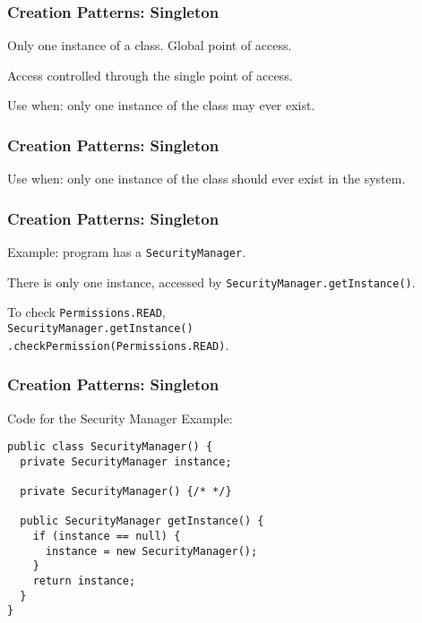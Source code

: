 \begin{frame}
\frametitle{Creation Patterns: Singleton}
\begin{changemargin}{1cm}
Only one instance of a class. Global point of access.

Access controlled through the single point of access.

Use when: only one instance of the class may ever exist.

\end{changemargin}
\end{frame}

\begin{frame}
\frametitle{Creation Patterns: Singleton}
\begin{changemargin}{1cm}

Use when: only one instance of the class should ever exist in the system.

\end{changemargin}
\end{frame}

\begin{frame}
\frametitle{Creation Patterns: Singleton}
\begin{changemargin}{1cm}

Example: program has a \texttt{SecurityManager}.

There is only one instance, accessed by \texttt{SecurityManager.getInstance()}.

To check \texttt{Permissions.READ},\\ \texttt{SecurityManager.getInstance()\\.checkPermission(Permissions.READ)}.


\end{changemargin}
\end{frame}

\begin{frame}[fragile]
\frametitle{Creation Patterns: Singleton}
\begin{changemargin}{1cm}
Code for the Security Manager Example:

\begin{verbatim}
public class SecurityManager() {
  private SecurityManager instance;
  
  private SecurityManager() {/* */}
  
  public SecurityManager getInstance() {
    if (instance == null) {
      instance = new SecurityManager();
    }
    return instance;
  }
}  
\end{verbatim}
\end{changemargin}
\end{frame}


